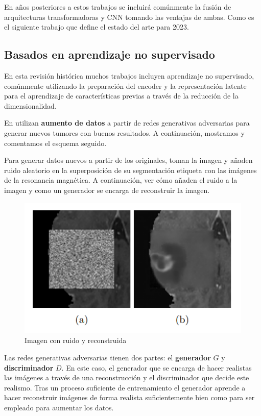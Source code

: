 	
	En años posteriores a estos trabajos se incluirá comúnmente la fusión de arquitecturas transformadoras y CNN tomando las ventajas de ambas. Como es el siguiente trabajo que define el estado del arte para 2023.
	
	\subsection{Basados en aprendizaje no supervisado}
	
	En esta revisión histórica muchos trabajos incluyen aprendizaje no supervisado, comúnmente utilizando la preparación del encoder y la representación latente para el aprendizaje de características previas a través de la reducción de la dimensionalidad. 
	
	En \cite{ferreira2024we} utilizan \textbf{aumento de datos} a partir de redes generativas adversarias para generar nuevos tumores con buenos resultados. A continuación, mostramos y comentamos el esquema seguido.
	
	Para generar datos nuevos a partir de los originales, toman la imagen y añaden ruido aleatorio en la superposición de su segmentación etiqueta con las imágenes de la resonancia magnética. A continuación, ver cómo añaden el ruido a la imagen y como un generador se encarga de reconstruir la imagen.
	
	\begin{figure}[H]
		\centering
		\includegraphics[width=0.5\linewidth]{imagenes/imagen_faking.png}
		\caption{Imagen con ruido y reconstruida \cite{ferreira2024we}}
	\end{figure}
	
	Las redes generativas adversarias tienen dos partes: el \textbf{generador} $G$ y \textbf{discriminador} $D$. En este caso, el generador que se encarga de hacer realistas las imágenes a través de una reconstrucción y el discriminador que decide este realismo. Tras un proceso suficiente de entrenamiento el generador aprende a hacer reconstruir imágenes de forma realista suficientemente bien como para ser empleado para aumentar los datos.
	
